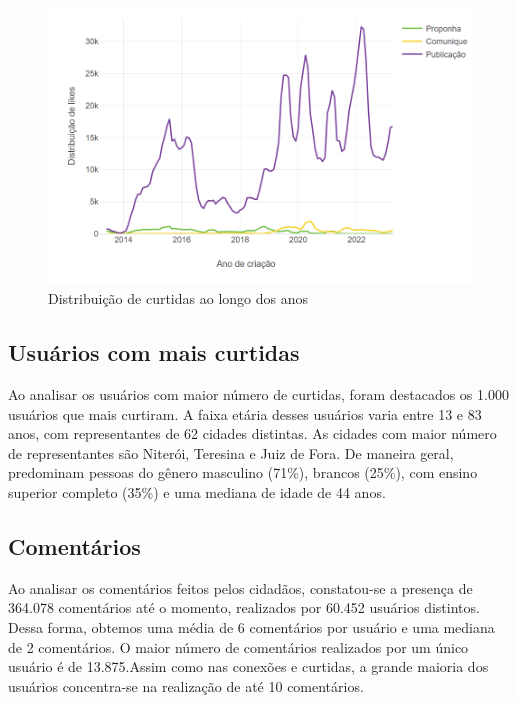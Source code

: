 \begin{figure}[!htb]
	\caption{Distribuição de curtidas ao longo dos anos}
	\label{fig:colab_likes_overtime}
	\centering
	\includegraphics[scale=0.5]{images/colab_likes_overtime.png}
\end{figure}

\subsection*{Usuários com mais curtidas}

Ao analisar os usuários com maior número de curtidas, foram destacados os 1.000 usuários que mais curtiram. A faixa etária desses usuários varia entre 13 e 83 anos, com representantes de 62 cidades distintas. As cidades com maior número de representantes são Niterói, Teresina e Juiz de Fora. De maneira geral, predominam pessoas do gênero masculino (71\%), brancos (25\%), com ensino superior completo (35\%) e uma mediana de idade de 44 anos.

\subsection*{Comentários}

Ao analisar os comentários feitos pelos cidadãos, constatou-se a presença de 364.078 comentários até o momento, realizados por 60.452 usuários distintos. Dessa forma, obtemos uma média de 6 comentários por usuário e uma mediana de 2 comentários. O maior número de comentários realizados por um único usuário é de 13.875.Assim como nas conexões e curtidas, a grande maioria dos usuários concentra-se na realização de até 10 comentários.

